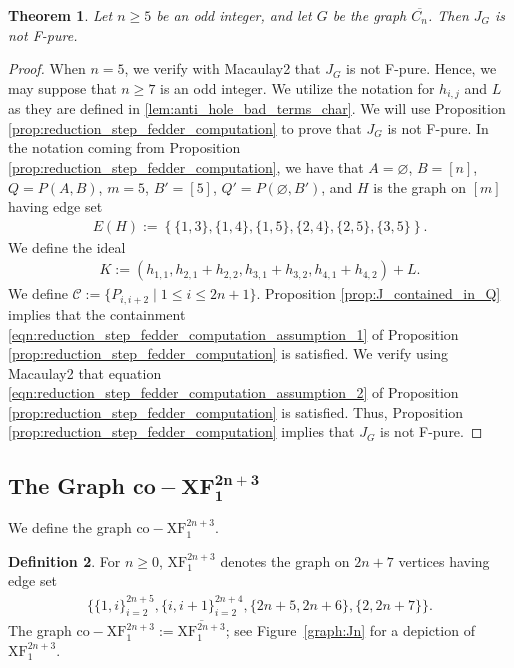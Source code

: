 \documentclass[12pt,a4paper]{amsart}
\theoremstyle{plain}
\newtheorem{thrm}{Theorem}[section]
\def\bthm{\begin{thrm}}
\def\ethm{\end{thrm}}
\theoremstyle{definition}
\newtheorem{defn}[thrm]{Definition}
\def\bdefn{\begin{defn}}
\def\edefn{\end{defn}}
\def\bproof{\begin{proof}}
\def\eproof{\end{proof}}
\theoremstyle{remark}
\newcommand{\mc}[1]{\mathcal{ #1 }}
\newcommand{\ol}[1]{\overline{#1}}
\begin{document}
\bthm
\label{thm:Cn_not_F_pure}
Let $n \geq 5$ be an odd integer, and let $G$ be the graph $\ol{C_{n}}$. Then $J_{G}$ is not F-pure.
\ethm

\bproof
When $n = 5$, we verify with Macaulay2 that $J_{G}$ is not F-pure. Hence, we may suppose that $n \geq 7$ is an odd integer. We utilize the notation for $h_{i,j}$ and $L$ as they are defined in \ref{lem:anti_hole_bad_terms_char}. We will use Proposition \ref{prop:reduction_step_fedder_computation} to prove that $J_{G}$ is not F-pure. In the notation coming from Proposition \ref{prop:reduction_step_fedder_computation}, we have that $A = \varnothing$, $B = [n]$, $Q = P(A,B)$, $m = 5$, $B' = [5]$, $Q' = P(\varnothing,B')$, and $H$ is the graph on $[m]$ having edge set
\begin{align*}
    E(H) := \left\{ \{1,3\},\{1,4\},\{1,5\},\{2,4\},\{2,5\},\{3,5\} \right\}.
\end{align*}
We define the ideal
\begin{align*}
    K := (h_{1,1},h_{2,1}+h_{2,2},h_{3,1}+h_{3,2},h_{4,1}+h_{4,2}) + L.
\end{align*}
We define $\mc{C} := \{P_{i,i+2} \mid 1 \leq i \leq 2n+1\}$. Proposition \ref{prop:J_contained_in_Q} implies that the containment \eqref{eqn:reduction_step_fedder_computation_assumption_1} of Proposition \ref{prop:reduction_step_fedder_computation} is satisfied. We verify using Macaulay2 that equation \eqref{eqn:reduction_step_fedder_computation_assumption_2} of Proposition \ref{prop:reduction_step_fedder_computation} is satisfied. Thus, Proposition \ref{prop:reduction_step_fedder_computation} implies that $J_{G}$ is not F-pure.
\eproof

\subsection{The Graph $\mathbf{co\!-\!XF_1^{2n+3}}$}

We define the graph $\mathrm{co\!-\!XF}_1^{2n+3}$.
\bdefn
For $n \geq 0$, $\mathrm{XF}_1^{2n+3}$ denotes the graph on $2n+7$ vertices having edge set 
\begin{align*}
\{ \{1,i\}_{i = 2}^{2n+5}, \{i,i+1\}_{i=2}^{2n+4}, \{2n+5,2n+6\}, \{2, 2n+7\} \}.
\end{align*}
The graph $\mathrm{co\!-\!XF}_1^{2n+3} := \ol{\mathrm{XF}_1^{2n+3}}$; see Figure~\ref{graph:Jn} for a depiction of $\mathrm{XF}_1^{2n+3}$.
\edefn


\def\edJn{2}
\def\scale{0.75}
\end{document}
